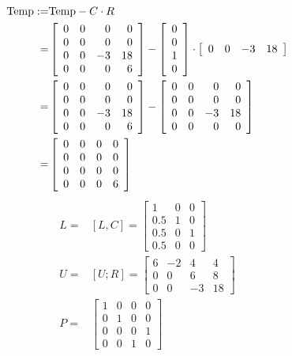 \begin{align*}
    {\rm Temp} :=& {\rm Temp} - C \cdot R \\
    =& \left[\begin{array}{rrrr} 0 & 0 & 0 & 0\\ 0 & 0 & 0 & 0 \\ 0 & 0 & -3 & 18 \\0 & 0 & 0 & 6 \end{array}\right] 
    - \left[ \begin{array}{r} 0 \\ 0 \\ 1 \\ 0 \end{array} \right] \cdot \left[ \begin{array}{rrrr} 0 & 0 & -3 & 18 \end{array} \right] \\
    =& \left[\begin{array}{rrrr} 0 & 0 & 0 & 0\\ 0 & 0 & 0 & 0 \\ 0 & 0 & -3 & 18 \\0 & 0 & 0 & 6 \end{array}\right] - \left[\begin{array}{rrrr} 0 & 0 & 0 & 0\\ 0 & 0 & 0 & 0 \\ 0 & 0 & -3 & 18 \\0 & 0 & 0 & 0 \end{array}\right] \\
    =& \left[\begin{array}{rrrr} 0 & 0 & 0 & 0\\ 0 & 0 & 0 & 0 \\ 0 & 0 & 0 & 0 \\0 & 0 & 0 & 6 \end{array}\right] \\
\end{align*}
\begin{align*}
    L =& [L, C] = \left[ \begin{array}{rrr} 1 & 0 & 0 \\ 0.5 & 1 & 0 \\ 0.5 & 0 & 1 \\ 0.5 & 0 & 0 \end{array} \right] \\
    U =& [U; R] = \left[ \begin{array}{rrrr} 6 & -2 & 4 & 4 \\ 0 & 0 & 6 & 8 \\ 0 & 0 & -3 & 18 \end{array} \right] \\
    P =& \left[\begin{array}{rrrr} 1 & 0 & 0 & 0\\ 0 & 1 & 0 & 0 \\ 0 & 0 & 0 & 1 \\0 & 0 & 1 & 0 \end{array}\right]
\end{align*}

